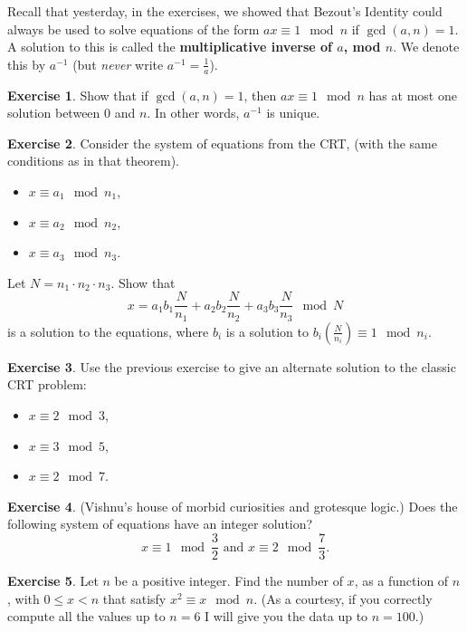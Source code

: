 \documentclass[11pt]{article}
\theoremstyle{definition}
\newtheorem{exercise}{Exercise}
\numberwithin{thm}{section}
\begin{document}
Recall that yesterday, in the exercises, we showed that Bezout's Identity could always be used to solve equations of the form $ax \equiv 1 \mod n$ if $\gcd(a,n) = 1$. A solution to this is called the \textbf{multiplicative inverse of $a$, mod $n$}. We denote this by $a^{-1}$ (but \textit{never} write $a^{-1} = \frac{1}{a}$).

\begin{exercise} Show that if $\gcd(a,n) = 1$, then $ax \equiv 1 \mod n$ has at most one solution between $0$ and $n$. In other words, $a^{-1}$ is unique.
\end{exercise}

\begin{exercise} Consider the system of equations from the CRT, (with the same conditions as in that theorem).
\begin{itemize}
	\item $x \equiv a_1 \mod n_1$,
    \item $x \equiv a_2 \mod n_2$,
    \item $x \equiv a_3 \mod n_3$.
\end{itemize}
Let $N = n_1 \cdot n_2 \cdot n_3$. Show that
\[
	x = a_1 b_1 \frac{N}{n_1} + a_2 b_2 \frac{N}{n_2} + a_3 b_3 \frac{N}{n_3} \mod N
\]
is a solution to the equations, where $b_i$ is a solution to $b_i \left( \frac{N}{n_i}\right) \equiv 1 \mod n_i$.
\end{exercise}

\begin{exercise} Use the previous exercise to give an alternate solution to the classic CRT problem:
\begin{itemize}
	\item $x \equiv 2 \mod 3$,
    \item $x \equiv 3 \mod 5$,
    \item $x \equiv 2 \mod 7$.
\end{itemize}
\end{exercise}

\begin{exercise} (Vishnu's house of morbid curiosities and grotesque logic.) Does the following system of equations have an integer solution?
\[
	x \equiv 1 \mod \frac{3}{2} \text{  and  }x \equiv 2 \mod \frac{7}{3}.
\]
\end{exercise}

\begin{exercise} Let $n$ be a positive integer. Find the number of $x$, as a function of $n$, with $0 \leq x < n$ that satisfy $x^2 \equiv x \mod n$. (As a courtesy, if you correctly compute all the values up to $n=6$ I will give you the data up to $n=100$.)
\end{exercise}
\end{document}
